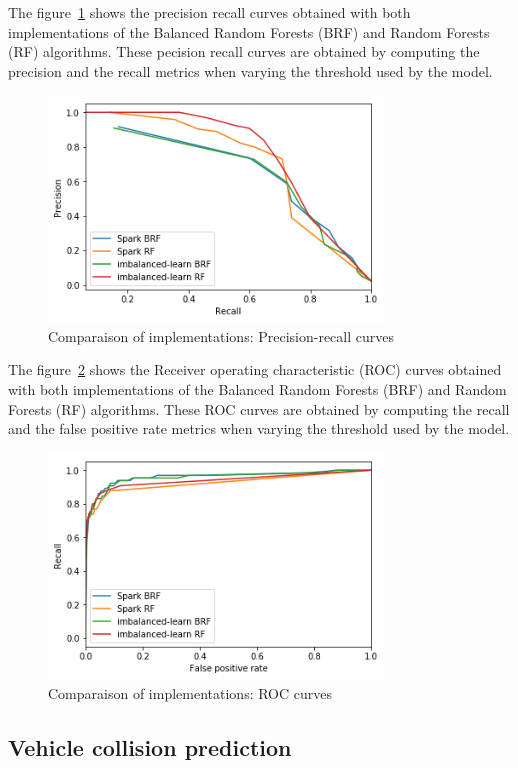 \documentclass[conference]{IEEEtran}
\begin{document}
The figure~\ref{fig:test-brf-precision-recall} shows the precision recall curves obtained with both implementations of the Balanced Random Forests (BRF) and Random Forests (RF) algorithms. These pecision recall curves are obtained by computing the precision and the recall metrics when varying the threshold used by the model.

\begin{figure}[htbp]
\centerline{\includegraphics[height=6cm, keepaspectratio]{figures/test_brf_pr.png}}
\caption{Comparaison of implementations: Precision-recall curves}
\label{fig:test-brf-precision-recall}
\end{figure}

The figure~\ref{fig:test-brf-roc} shows the Receiver operating characteristic (ROC) curves obtained with both implementations of the Balanced Random Forests (BRF) and Random Forests (RF) algorithms. These ROC curves are obtained by computing the recall and the false positive rate metrics when varying the
threshold used by the model.

\begin{figure}[htbp]
\centerline{\includegraphics[height=6cm, keepaspectratio]{figures/test_brf_roc.png}}
\caption{Comparaison of implementations: ROC curves}
\label{fig:test-brf-roc}
\end{figure}

\subsection{Vehicle collision prediction}
\end{document}
